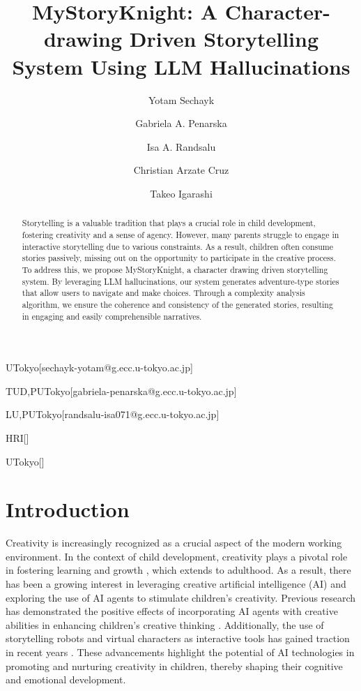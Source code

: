 \documentclass[submit,techrep,english]{ipsj}
\begin{document}
\title{MyStoryKnight: A Character-drawing Driven Storytelling System Using LLM Hallucinations}


\author{Yotam Sechayk}{UTokyo}[sechayk-yotam@g.ecc.u-tokyo.ac.jp]
\author{Gabriela A. Penarska}{TUD,PUTokyo}[gabriela-penarska@g.ecc.u-tokyo.ac.jp]
\author{Isa A. Randsalu}{LU,PUTokyo}[randsalu-isa071@g.ecc.u-tokyo.ac.jp]
\author{Christian Arzate Cruz}{HRI}[]

\author{Takeo Igarashi}{UTokyo}[]

\begin{abstract}
    Storytelling is a valuable tradition that plays a crucial role in child development, fostering creativity and a sense of agency. However, many parents struggle to engage in interactive storytelling due to various constraints. As a result, children often consume stories passively, missing out on the opportunity to participate in the creative process. To address this, we propose MyStoryKnight, a character drawing driven storytelling system. By leveraging LLM hallucinations, our system generates adventure-type stories that allow users to navigate and make choices. Through a complexity analysis algorithm, we ensure the coherence and consistency of the generated stories, resulting in engaging and easily comprehensible narratives.
\end{abstract}

\maketitle

\section{Introduction}
\label{sec:introduction}

Creativity is increasingly recognized as a crucial aspect of the modern working environment. In the context of child development, creativity plays a pivotal role in fostering learning and growth \cite{1:ElgarfP22}, which extends to adulthood. As a result, there has been a growing interest in leveraging creative artificial intelligence (AI) and exploring the use of AI agents to stimulate children's creativity. Previous research has demonstrated the positive effects of incorporating AI agents with creative abilities in enhancing children's creative thinking \cite{1:ElgarfP22}. Additionally, the use of storytelling robots and virtual characters as interactive tools has gained traction in recent years \cite{7:SunLLL17}. These advancements highlight the potential of AI technologies in promoting and nurturing creativity in children, thereby shaping their cognitive and emotional development.
\end{document}
